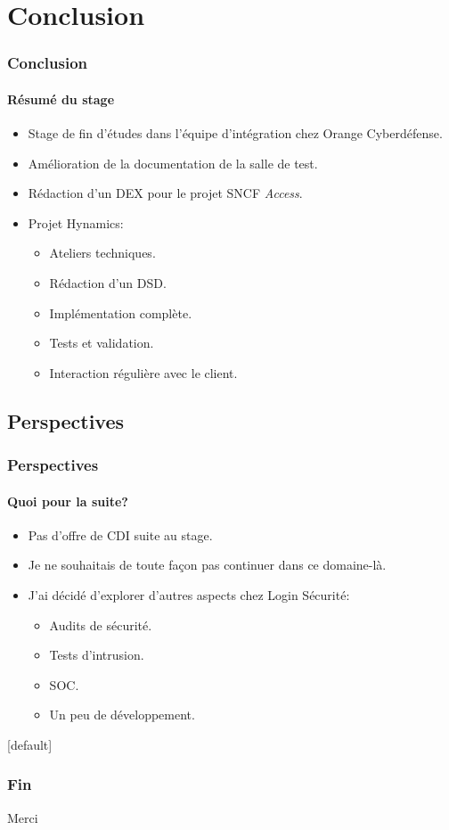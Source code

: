 \documentclass[french, a4paper]{beamer}
\makeatletter
\newenvironment{nohead}{%
        \setbeamertemplate{headline}[default]
        \def\beamer@entrycode{\vspace*{-\headheight}}
    }{}
\makeatother
\begin{document}
\section{Conclusion}

\begin{frame}
    \frametitle{Conclusion}
    \framesubtitle{Résumé du stage}
    \begin{itemize}
        \item Stage de fin d'études dans l'équipe d'intégration chez Orange
            Cyberdéfense.
        \item Amélioration de la documentation de la salle de test.
        \item Rédaction d'un DEX pour le projet SNCF \textit{Access}.
        \item Projet Hynamics:
        \begin{itemize}
            \item Ateliers techniques.
            \item Rédaction d'un DSD\@.
            \item Implémentation complète.
            \item Tests et validation.
            \item Interaction régulière avec le client.
        \end{itemize}
    \end{itemize}
\end{frame}

\subsection{Perspectives}

\begin{frame}
    \frametitle{Perspectives}
    \framesubtitle{Quoi pour la suite?}
    \begin{itemize}
        \item Pas d'offre de CDI suite au stage.
        \item Je ne souhaitais de toute façon pas continuer dans ce domaine-là.
        \item J'ai décidé d'explorer d'autres aspects chez Login Sécurité:
        \begin{itemize}
            \item Audits de sécurité.
            \item Tests d'intrusion.
            \item SOC\@.
            \item Un peu de développement.
        \end{itemize}
    \end{itemize}
\end{frame}

\begin{nohead}
    \begin{frame}
        \frametitle{Fin}
        \begin{center}
            \LARGE Merci
        \end{center}
    \end{frame}
\end{nohead}
\end{document}
